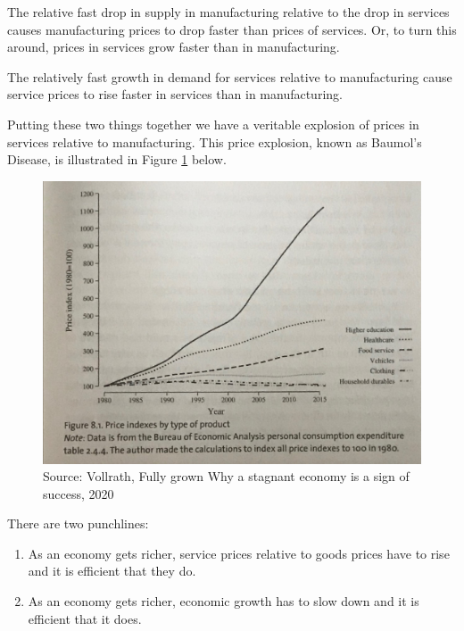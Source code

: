 \documentclass[
]{book}
\begin{document}
The relative fast drop in supply in manufacturing relative to the drop in services causes manufacturing prices to drop faster than prices of services. Or, to turn this around, prices in services grow faster than in manufacturing.

The relatively fast growth in demand for services relative to manufacturing cause service prices to rise faster in services than in manufacturing.

Putting these two things together we have a veritable explosion of prices in services relative to manufacturing. This price explosion, known as Baumol's Disease, is illustrated in Figure \ref{fig:compmarkets14} below.

\begin{figure}

{\centering \includegraphics[width=1\linewidth]{img/compmarkets/fig14} 

}

\caption{Source: Vollrath, Fully grown Why a stagnant economy is a sign of success, 2020 }\label{fig:compmarkets14}
\end{figure}

There are two punchlines:

\begin{enumerate}
\def\labelenumi{\arabic{enumi}.}
\item
  As an economy gets richer, service prices relative to goods prices have to rise and it is efficient that they do.
\item
  As an economy gets richer, economic growth has to slow down and it is efficient that it does.
\end{enumerate}
\end{document}

